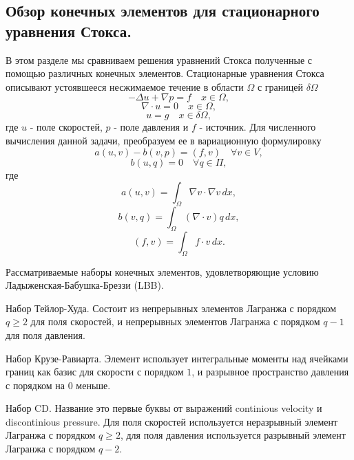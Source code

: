 \documentclass[12pt]{article}
\begin{document}
\subsection{Обзор конечных элементов для стационарного уравнения Стокса.}
В этом разделе мы сравниваем решения уравнений Стокса полученные с помощью различных конечных элементов.
Стационарные уравнения Стокса описывают устоявшееся несжимаемое течение в области $\Omega$ с границей $\delta\Omega$
\begin{equation}
-\Delta u + \nabla p = f \quad x \in \Omega,
\end{equation}
\begin{equation}
\nabla\cdot u = 0 \quad x \in \Omega,
\end{equation}
\begin{equation} \label{eq:stokes-boundary}
u = g \quad x \in \delta\Omega,
\end{equation}
где $u$ - поле скоростей, $p$ - поле давления и $f$ - источник. Для численного вычисления данной задачи, преобразуем ее в вариационную формулировку
\begin{equation}
a(u,v)-b(v,p)=(f,v) \quad \forall v \in V,
\end{equation}
\begin{equation}
b(u,q)=0 \quad \forall q \in \Pi,
\end{equation}
где 
\begin{equation}
a(u,v)=\int_\Omega \nabla v \cdot \nabla v \, dx,
\end{equation}
\begin{equation}
b(v,q)=\int_\Omega (\nabla \cdot v) q \, dx,
\end{equation}
\begin{equation}
(f,v)=\int_\Omega f \cdot v \, dx.
\end{equation}

Рассматриваемые наборы конечных элементов, удовлетворяющие условию Ладыженская-Бабушка-Бреззи (LBB).

Набор Тейлор-Худа.
Состоит из непрерывных элементов Лагранжа с порядком $q \geq 2$ для поля скоростей, и непрерывных элементов Лагранжа с порядком $q - 1$ для поля давления.

Набор Крузе-Равиарта.
Элемент использует интегральные моменты над ячейками границ как базис для скорости с порядком $1$, и разрывное пространство давления с порядком на $0$ меньше.

Набор CD.
Название это первые буквы от выражений continious velocity и discontinious pressure.
Для поля скоростей используется неразрывный элемент Лагранжа с порядком $q \geq 2$, для поля давления используется разрывный элемент Лагранжа с порядком $q-2$. 
\end{document}

